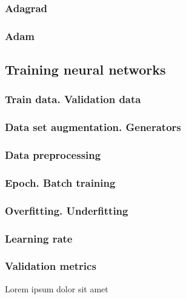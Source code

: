 \subsubsection{Adagrad}
\label{subsubsec:ch3sec3subsec6subsubsec2}

\subsubsection{Adam}
\label{subsubsec:ch3sec3subsec6subsubsec2}

\subsection{Training neural networks}
\label{subsec:ch3sec3subsec7}

\subsubsection{Train data. Validation data}
\label{subsubsec:ch3sec3subsec7subsubsec1}

\subsubsection{Data set augmentation. Generators}
\label{subsubsec:ch3sec3subsec7subsubsec2}

\subsubsection{Data preprocessing}
\label{subsubsec:ch3sec3subsec7subsubsec3}

\subsubsection{Epoch. Batch training}
\label{subsubsec:ch3sec3subsec7subsubsec4}

\subsubsection{Overfitting. Underfitting}
\label{subsubsec:ch3sec3subsec7subsubsec5}

\subsubsection{Learning rate}
\label{subsubsec:ch3sec3subsec7subsubsec6}

\subsubsection{Validation metrics}
\label{subsubsec:ch3sec3subsec7subsubsec7}

\par Lorem ipsum dolor sit amet
